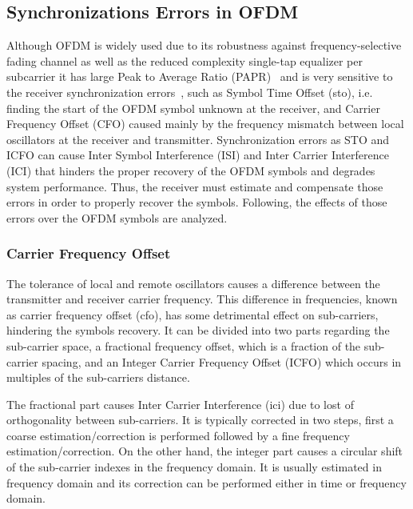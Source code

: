 \subsection{Synchronizations Errors in OFDM}

Although OFDM is widely used due to its robustness against frequency-selective fading channel as well as the reduced complexity single-tap equalizer per subcarrier \cite{chiueh2012baseband} it has large Peak to Average Ratio (PAPR)~\cite{prasad2004ofdm} and is very sensitive to the receiver synchronization errors~\cite{ber_cfo_ofdm}, such as Symbol Time Offset (\ac{sto}), i.e. finding the start of the OFDM symbol unknown at the receiver, and Carrier Frequency Offset (CFO) caused mainly by the frequency mismatch between local oscillators at the receiver and transmitter. Synchronization errors as STO and ICFO can cause Inter Symbol Interference (ISI) and Inter Carrier Interference (ICI) that hinders the proper recovery of the OFDM symbols and degrades system performance. Thus, the receiver must estimate and compensate those errors in order to properly recover the symbols. Following, the effects of those errors over the OFDM symbols are analyzed. 


\subsubsection{Carrier Frequency Offset}
\label{sec:icfo}

 
 The tolerance of local and remote oscillators causes a difference between the transmitter and receiver carrier frequency. This difference in frequencies, known as carrier frequency offset (\ac{cfo}), has some detrimental effect on sub-carriers,  hindering the symbols recovery. It can be divided into two parts regarding the sub-carrier space, a fractional frequency offset, which is a fraction of the sub-carrier spacing, and an Integer Carrier Frequency Offset (ICFO) which occurs in multiples of the sub-carriers distance.   
    
  The fractional part causes Inter Carrier Interference (\ac{ici}) due to lost of orthogonality between sub-carriers. It is typically corrected in two steps, first a coarse estimation/correction is performed followed by a fine frequency estimation/correction. On the other hand, the integer part causes a circular shift of the sub-carrier indexes in the frequency domain. It is usually estimated in frequency domain and its correction can be performed either in time or frequency domain. 

